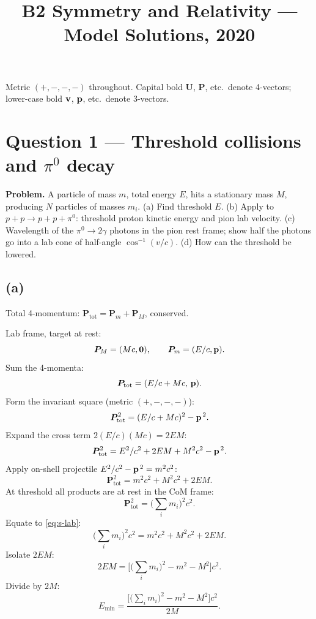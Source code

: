 \documentclass[11pt]{article}
\title{B2 Symmetry and Relativity --- Model Solutions, 2020}
\author{}
\date{}
\begin{document}
\maketitle

Metric $(+,-,-,-)$ throughout. Capital bold $\bm U$, $\bm P$, etc.\ denote 4-vectors; lower-case bold $\vb v$, $\vb p$, etc.\ denote 3-vectors.

\section*{Question 1 --- Threshold collisions and $\pi^0$ decay}

\textbf{Problem.} A particle of mass $m$, total energy $E$, hits a stationary mass $M$, producing $N$ particles of masses $m_i$. (a) Find threshold $E$. (b) Apply to $p+p\to p+p+\pi^0$: threshold proton kinetic energy and pion lab velocity. (c) Wavelength of the $\pi^0\to 2\gamma$ photons in the pion rest frame; show half the photons go into a lab cone of half-angle $\cos^{-1}(v/c)$. (d) How can the threshold be lowered.

\subsection*{(a)}

Total 4-momentum: $\bm P_\text{tot}=\bm P_m+\bm P_M$, conserved.

Lab frame, target at rest:
\[ \bm P_M=(Mc,\bm 0),\qquad \bm P_m=(E/c,\vb p). \]
Sum the 4-momenta:
\[ \bm P_\text{tot} = (E/c + Mc,\,\vb p). \]
Form the invariant square (metric $(+,-,-,-)$):
\[ \bm P_\text{tot}^2 = (E/c+Mc)^2-\vb p^{\,2}. \]
Expand the cross term $2(E/c)(Mc)=2EM$:
\[ \bm P_\text{tot}^2 = E^2/c^2 + 2EM + M^2c^2 - \vb p^{\,2}. \]
Apply on-shell projectile $E^2/c^2-\vb p^{\,2}=m^2c^2$:
\begin{equation}
\bm P_\text{tot}^2 = m^2c^2 + M^2c^2 + 2EM.
\label{eq:s-lab}
\end{equation}
At threshold all products are at rest in the CoM frame:
\[ \bm P_\text{tot}^2 = \Big(\textstyle\sum_i m_i\Big)^2 c^2. \]
Equate to \eqref{eq:s-lab}:
\[ \bigl(\textstyle\sum_i m_i\bigr)^2 c^2 = m^2c^2 + M^2c^2 + 2EM. \]
Isolate $2EM$:
\[ 2EM = \bigl[\bigl(\textstyle\sum_i m_i\bigr)^2 - m^2 - M^2\bigr]c^2. \]
Divide by $2M$:
\begin{equation}
\boxed{\;E_\text{min} = \frac{\bigl[\bigl(\sum_i m_i\bigr)^2 - m^2 - M^2\bigr]c^2}{2M}.\;}
\label{eq:Emin}
\end{equation}
\end{document}
